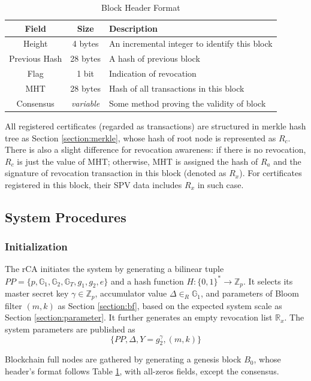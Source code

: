 \documentclass[conference]{IEEEtran}
\begin{document}
\begin{table}[h] 
	\caption{Block Header Format}\label{table:format}
	\centering
	\begin{tabular}{c|c|l}
		\hline
		Field & Size & Description \\
		\hline
		Height & 4 bytes & An incremental integer to identify this block \\
		Previous Hash & 28 bytes & A hash of previous block \\
		Flag & 1 bit & Indication of revocation \\
		MHT & 28 bytes & Hash of all transactions in this block \\
		Consensus & \textit{variable} & Some method proving the validity of block\\
		\hline
	\end{tabular}
\end{table}

All registered certificates (regarded as transactions) are structured in merkle hash tree as Section \ref{section:merkle}, whose hash of root node is represented as $R_c$. There is also a slight difference for revocation awareness: if there is no revocation, $R_c$ is just the value of MHT; otherwise, MHT is assigned the hash of $R_a$ and the signature of revocation transaction in this block (denoted as $R_x$). For certificates registered in this block, their SPV data includes $R_x$ in such case.


\subsection{System Procedures}

\subsubsection{Initialization}
The rCA initiates the system by generating a bilinear tuple $PP=\{p, \mathbb{G}_1, \mathbb{G}_2, \mathbb{G}_T, g_1, g_2, e\}$ and a hash function $H:\{0, 1\}^* \rightarrow \mathbb{Z}_p$. It selects its master secret key $\gamma\in \mathbb{Z}_p$, accumulator value $\Delta\in_R \mathbb{G}_1$, 
and parameters of Bloom filter $(m, k)$ as Section \ref{section:bf}, based on the expected system scale as Section \ref{section:parameter}. It further generates an empty revocation list $\mathbb{R}_x$. The system parameters are published as 
$$ \bigl\{ PP, \Delta, Y = g_2^\gamma, (m, k) \bigr\}$$

Blockchain full nodes are gathered by generating a genesis block $B_0$, whose header's format follows Table \ref{table:format}, with all-zeros fields, except the consensus. 
\end{document}
